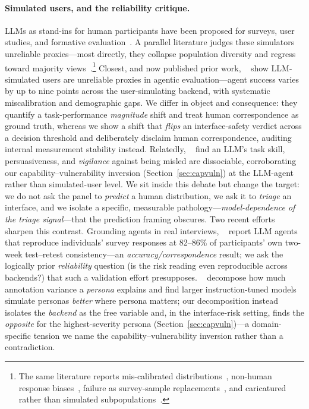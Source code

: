 \documentclass[manuscript,review,anonymous]{acmart}
\begin{document}
\paragraph{Simulated users, and the reliability critique.} LLMs as stand-ins for human participants have
been proposed for surveys, user studies, and formative
evaluation~\cite{park2022social,argyle2023out,aher2023using}. A parallel literature judges these simulators
unreliable proxies---most directly, they collapse population diversity and regress toward majority
views~\cite{santurkar2023whose}.\footnote{The same literature reports mis-calibrated
distributions~\cite{cao2025specializing,dominguez2024questioning}, non-human response
biases~\cite{tjuatja2024llms}, failure as survey-sample replacements~\cite{bisbee2024synthetic}, and
caricatured rather than simulated subpopulations~\cite{cheng2023compost}.} Closest, and now published prior work,
\citeauthor{seshadri2026lost}~\cite{seshadri2026lost} show LLM-simulated users are unreliable proxies in
agentic evaluation---agent success varies by up to nine points across the user-simulating backend, with
systematic miscalibration and demographic gaps. We differ in object and consequence: they quantify a
task-performance \emph{magnitude} shift and treat human correspondence as ground truth, whereas we show a
shift that \emph{flips} an interface-safety verdict across a decision threshold and deliberately disclaim
human correspondence, auditing internal measurement stability instead. Relatedly,
\citeauthor{robinson2026influence}~\cite{robinson2026influence} find an LLM's task skill, persuasiveness, and
\emph{vigilance} against being misled are dissociable, corroborating our capability--vulnerability inversion
(Section~\ref{sec:capvuln}) at the LLM-agent rather than simulated-user level. We sit inside this debate but change the
target: we do not ask the panel to \emph{predict} a human distribution, we ask it to \emph{triage} an
interface, and we isolate a specific, measurable pathology---\emph{model-dependence of the triage
signal}---that the prediction framing obscures. Two recent efforts sharpen this contrast. Grounding agents
in real interviews, \citeauthor{park2024generative}~\cite{park2024generative} report LLM agents that
reproduce individuals' survey responses at 82--86\% of participants' own two-week test--retest
consistency---an \emph{accuracy/correspondence}
result; we ask the logically prior \emph{reliability} question (is the risk reading even reproducible across
backends?) that such a validation effort presupposes. \citeauthor{hu2024quantifying}~\cite{hu2024quantifying}
decompose how much annotation variance a \emph{persona} explains and find larger instruction-tuned models
simulate personas \emph{better} where persona matters; our decomposition instead isolates the \emph{backend}
as the free variable and, in the interface-risk setting, finds the \emph{opposite} for the highest-severity
persona (Section~\ref{sec:capvuln})---a domain-specific tension we name the capability--vulnerability
inversion rather than a contradiction.
\end{document}
